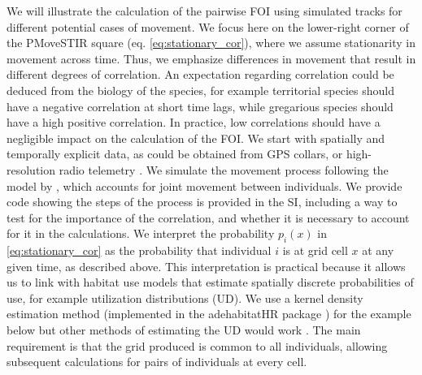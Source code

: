 \documentclass[letterpaper]{article}
\begin{document}
We will illustrate the calculation of the pairwise FOI using simulated tracks for different potential cases of movement. We focus here on the lower-right corner of the PMoveSTIR square (eq. \ref{eq:stationary_cor}), where we assume stationarity in movement across time. Thus, we emphasize differences in movement that result in different degrees of correlation. An expectation regarding correlation could be deduced from the biology of the species, for example territorial species should have a negative correlation at short time lags, while gregarious species should have a high positive correlation. In practice, low correlations should have a negligible impact on the calculation of the FOI. 
We start with spatially and temporally explicit data, as could be obtained from GPS collars, or high-resolution radio telemetry \citep{Aspillaga2021}. We simulate the movement process following the model by \citet{Scharf2018}, which accounts for joint movement between individuals. We provide code showing the steps of the process is provided in the SI, including a way to test for the importance of the correlation, and whether it is necessary to account for it in the calculations. %
We interpret the probability $p_i(x)$ in \ref{eq:stationary_cor} as the probability that individual $i$ is at grid cell $x$ at any given time, as described above. This interpretation is practical because it allows us to link  with habitat use models that estimate spatially discrete probabilities of use, for example utilization distributions (UD). We use a kernel density estimation method (implemented in the adehabitatHR package \citep{}) for the example below but other methods of estimating the UD would work \citep[e.g.][]{Kranstauber2012,Signer2017}. The main requirement is that the grid produced is common to all individuals, allowing subsequent calculations for pairs of individuals at every cell. %
\end{document}
